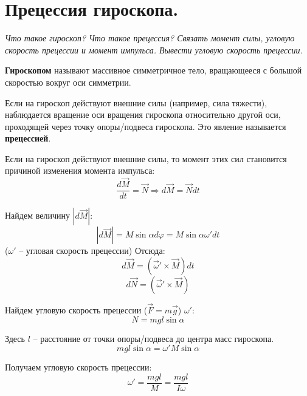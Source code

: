 \documentclass{article}
\begin{document}
    \section{Прецессия гироскопа.}
    \par
      \textit{Что такое гироскоп? Что такое прецессия? Связать момент силы, угловую скорость прецессии и момент импульса. Вывести угловую скорость прецессии.}\\
    \par 
      \textbf{Гироскопом} называют массивное симметричное тело, вращающееся с большой скоростью вокруг оси симметрии.
    \par
      Если на гироскоп действуют внешние силы (например, сила тяжести), наблюдается вращение оси вращения гироскопа относительно другой оси, проходящей через точку опоры/подвеса гироскопа. Это явление называется \textbf{прецессией}.
    \par
      Если на гироскоп действуют внешние силы, то момент этих сил становится причиной изменения момента импульса:
      \begin{equation}
	\frac{d\vec M}{dt}=\vec N\Rightarrow d\vec M=\vec Ndt
      \end{equation}
    \par
      Найдем величину $|d\vec M|$:
      \begin{equation}
	|d\vec M|=M\sin\alpha d\varphi = M\sin\alpha \omega' dt
      \end{equation}
      ($\omega'$ -- угловая скорость прецессии) Отсюда:
      \begin{equation}
	d\vec M=(\vec\omega'\times \vec M)dt
      \end{equation}
      \begin{equation}
	d\vec N=(\vec\omega'\times\vec M)
      \end{equation}   
    \par
      Найдем угловую скорость прецессии ($\vec F=m\vec g$) $\omega'$:
      \begin{equation}
	N=mgl\sin\alpha
      \end{equation}
    \par
      Здесь $l$ -- расстояние от точки опоры/подвеса до центра масс гироскопа.
      \begin{equation}
	mgl\sin\alpha=\omega'M\sin\alpha
      \end{equation}
    \par
      Получаем угловую скорость прецессии:
      \begin{equation}
	\omega'=\frac{mgl}{M}=\frac{mgl}{I\omega}
      \end{equation}
  \clearpage
    
\end{document}
